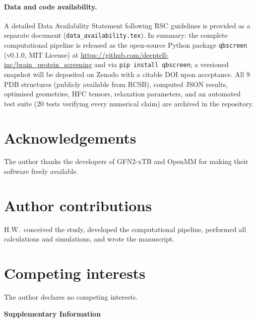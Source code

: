 \documentclass[11pt]{article}
\begin{document}
\paragraph{Data and code availability.}
A detailed Data Availability Statement following RSC guidelines is provided as a separate document (\texttt{data\_availability.tex}). In summary: the complete computational pipeline is released as the open-source Python package \texttt{qbscreen} (v0.1.0, MIT License) at \url{https://github.com/deeptell-inc/brain_protein_screening} and via \texttt{pip install qbscreen}; a versioned snapshot will be deposited on Zenodo with a citable DOI upon acceptance. All 9 PDB structures (publicly available from RCSB), computed JSON results, optimised geometries, HFC tensors, relaxation parameters, and an automated test suite (20 tests verifying every numerical claim) are archived in the repository.

\section*{Acknowledgements}
The author thanks the developers of GFN2-xTB and OpenMM for making their software freely available.

\section*{Author contributions}
H.W.\ conceived the study, developed the computational pipeline, performed all calculations and simulations, and wrote the manuscript.

\section*{Competing interests}
The author declares no competing interests.


\clearpage
\setcounter{equation}{0}
\setcounter{figure}{0}
\setcounter{table}{0}
\renewcommand{\theequation}{S\arabic{equation}}
\renewcommand{\thefigure}{S\arabic{figure}}
\renewcommand{\thetable}{S\arabic{table}}
\begin{center}
{\LARGE\bfseries Supplementary Information}
\end{center}
\vspace{1em}


\clearpage
\setcounter{equation}{0}
\setcounter{figure}{0}
\setcounter{table}{0}
\renewcommand{\theequation}{S\arabic{equation}}
\renewcommand{\thefigure}{S\arabic{figure}}
\renewcommand{\thetable}{S\arabic{table}}
\end{document}

